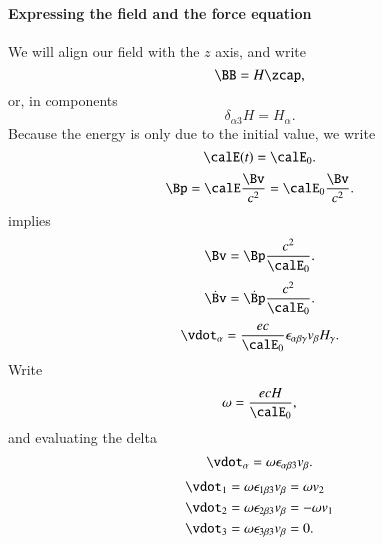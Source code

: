 {\paragraph{Expressing the field and the force equation}
%
We will align our field with the \(z\) axis, and write
%
\begin{equation}\label{eqn:relativisticElectrodynamicsT3:560}
\BB = H \zcap,
\end{equation}
%
or, in components
%
\begin{equation}\label{eqn:relativisticElectrodynamicsT3:580}
\delta_{\alpha 3} H = H_\alpha.
\end{equation}
%
Because the energy is only due to the initial value, we write
%
\begin{equation}\label{eqn:relativisticElectrodynamicsT3:540}
\calE(t) = \calE_0.
\end{equation}
%
\begin{equation}\label{eqn:relativisticElectrodynamicsT3:600}
\Bp = \calE \frac{\Bv}{c^2} = \calE_0 \frac{\Bv}{c^2}.
\end{equation}
%
implies
%
\begin{equation}\label{eqn:relativisticElectrodynamicsT3:620}
\Bv = \Bp \frac{c^2}{\calE_0}.
\end{equation}
%
\begin{equation}\label{eqn:relativisticElectrodynamicsT3:640}
\dot{\Bv} = \dot{\Bp} \frac{c^2}{\calE_0}.
\end{equation}
%
\begin{equation}\label{eqn:relativisticElectrodynamicsT3:660}
\vdot_\alpha = \frac{e c}{\calE_0} \epsilon_{\alpha \beta \gamma} v_\beta H_\gamma.
\end{equation}
%
Write
%
\begin{equation}\label{eqn:relativisticElectrodynamicsT3:680}
\omega = \frac{e c H}{\calE_0},
\end{equation}
and evaluating the delta
\begin{equation}\label{eqn:relativisticElectrodynamicsT3:700}
\vdot_\alpha = \omega \epsilon_{\alpha \beta 3} v_\beta.
\end{equation}
%
\begin{equation}\label{eqn:relativisticElectrodynamicsT3:720}
\begin{aligned}
\vdot_1 &= \omega \epsilon_{1 \beta 3} v_\beta = \omega v_2 \\
\vdot_2 &= \omega \epsilon_{2 \beta 3} v_\beta = - \omega v_1 \\
\vdot_3 &= \omega \epsilon_{3 \beta 3} v_\beta = 0.

\end{aligned}
\end{equation}}
